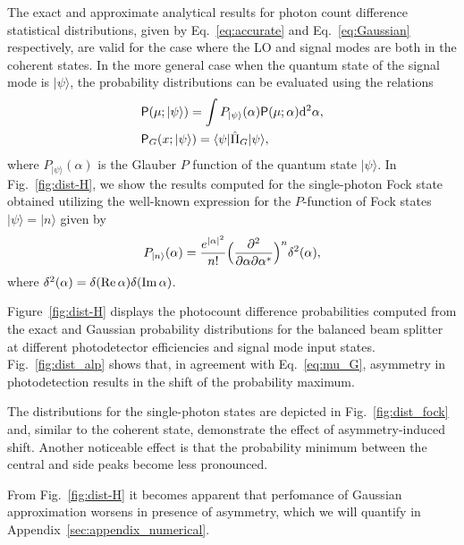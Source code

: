 \documentclass[%
reprint,
superscriptaddress,
 amsmath,amssymb,amsfonts,
 aps,
 pra,
 longbibliography
]{revtex4-2}
\newcommand{\ket}[1]{\ensuremath{|{#1}\rangle}}
\newcommand{\bra}[1]{\ensuremath{\langle{#1}|}}
\newcommand{\cnj}[1]{{#1}^{\ast}}
\renewcommand{\Re}{\mathop{\rm Re}\nolimits}
\renewcommand{\Im}{\mathop{\rm Im}\nolimits}
\newcommand{\prob}{\mathsf{P}}
\newcommand{\dd}{\mathrm{d}}
\begin{document}
The exact and approximate analytical results for photon count difference statistical distributions, given by Eq.~\eqref{eq:accurate} and Eq.~\eqref{eq:Gaussian} respectively, are valid
for the case where the LO and signal modes are both
in the coherent states. In the more general case when the quantum state of the signal mode
is $\ket{\psi}$,
the probability distributions can be evaluated
using the relations
\begin{align}
  &
\label{eq:average-P-func}
    \prob(\mu;\ket{\psi})=\int  P_{\ket{\psi}}(\alpha)\prob(\mu;\alpha)\dd^2\alpha,
    \notag
  \\
  &
    \prob_G(x;\ket{\psi})=\bra{\psi}\hat{\Pi}_G\ket{\psi},
\end{align}
where $P_{\ket{\psi}}(\alpha)$ is the Glauber $P$ function of the quantum state
$\ket{\psi}$.
In Fig.~\ref{fig:dist-H},
we show the results computed for the single-photon Fock state
obtained utilizing
the well-known expression for
the $P$-function of Fock states $\ket{\psi}=\ket{n}$ given by
\begin{equation}
\label{eq:P-function_fock}
P_{\ket{n}}(\alpha)=
\frac{e^{|\alpha|^2}}{n!}
\Bigl(
\frac{\partial^2}{\partial\alpha\partial\cnj{\alpha}}
\Bigr)^n
\delta^{2}(\alpha),
\end{equation}
where $\delta^{2}(\alpha)=\delta(\Re\alpha)\delta(\Im\alpha)$.

Figure~\ref{fig:dist-H} displays
the photocount difference probabilities
computed from
the exact and Gaussian probability distributions
for the balanced beam splitter at different photodetector efficiencies
and signal mode input states.
Fig.~\ref{fig:dist_alp} shows that,
in agreement with Eq.~\eqref{eq:mu_G},
asymmetry in photodetection
results in the shift of the probability maximum.

The distributions for the single-photon states
are depicted in Fig.~\ref{fig:dist_fock}
and, similar to the coherent state,
demonstrate the effect of asymmetry-induced shift.
Another noticeable effect is that
the probability minimum between the central and side peaks
become less pronounced.

From Fig.~\ref{fig:dist-H} it becomes apparent that perfomance of Gaussian approximation worsens in
presence of asymmetry, which we will quantify in Appendix~\ref{sec:appendix_numerical}.
\end{document}

